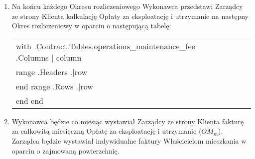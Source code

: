 \begin{enumerate}[label=\arabic*.]
	\item Na końcu każdego Okresu rozliczeniowego Wykonawca przedstawi Zarządcy ze strony Klienta kalkulację Opłaty za eksploatację i utrzymanie na następny Okres rozliczeniowy w oparciu o następującą tabelę:


\begin{center}
\begin{tabu}{|X|X|X|X|X|X|} \tabucline{}
{{with .Contract.Tables.operations_maintenance_fee}} %
	{{.Columns | column}} \\\tabucline{}
	{{range .Headers}} {{.|row}} \\\tabucline{} {{end}} %
	{{range .Rows}} {{.|row}} \\\tabucline{} {{end}} %
{{end}}
\end{tabu}
\end{center}

	\item Wykonawca będzie co miesiąc wystawiał Zarządcy ze strony Klienta fakturę za całkowitą miesięczną Opłatę za eksploatację i utrzymanie ($OM_m$). Zarządca będzie wystawiał indywidualne faktury Właścicielom mieszkania w oparciu o zajmowaną powierzchnię.
\end{enumerate}
